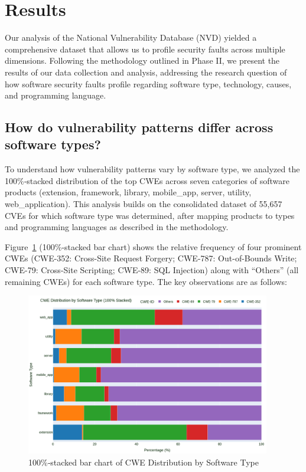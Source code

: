 \section{Results}

Our analysis of the National Vulnerability Database (NVD) yielded a comprehensive dataset that allows us to profile security faults across multiple dimensions. Following the methodology outlined in Phase II, we present the results of our data collection and analysis, addressing the research question of how software security faults profile regarding software type, technology, causes, and programming language.

\subsection{How do vulnerability patterns differ across software types?}

To understand how vulnerability patterns vary by software type, we analyzed the 100\%‐stacked distribution of the top CWEs across seven categories of software products (extension, framework, library, mobile\_app, server, utility, web\_application). This analysis builds on the consolidated dataset of 55,657 CVEs for which software type was determined, after mapping products to types and programming languages as described in the methodology.

Figure~\ref{fig:sw_typ_cwe} (100\%‐stacked bar chart) shows the relative frequency of four prominent CWEs (CWE-352: Cross-Site Request Forgery; CWE-787: Out-of-Bounds Write; CWE-79: Cross-Site Scripting; CWE-89: SQL Injection) along with “Others” (all remaining CWEs) for each software type. The key observations are as follows:

\begin{figure}[!h]
	\centering
    \includegraphics[width=0.95\textwidth]{figures/chapter_2/stacked_bar_software_cwe.png}
	\caption{100\%‐stacked bar chart of CWE Distribution by Software Type}
	\label{fig:sw_typ_cwe}
\end{figure}

